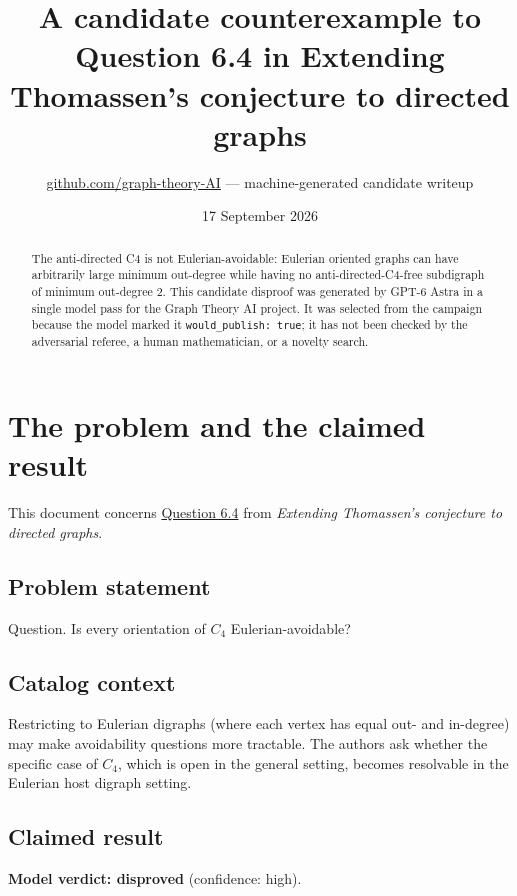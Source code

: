 \documentclass[
  11pt,
  a4paper,
]{article}
\title{A candidate counterexample to Question 6.4 in Extending
Thomassen's conjecture to directed graphs}
\author{\href{https://github.com/graph-theory-AI}{github.com/graph-theory-AI}
--- machine-generated candidate writeup}
\date{17 September 2026}
\begin{document}
\maketitle
\begin{abstract}
The anti-directed C4 is not Eulerian-avoidable: Eulerian oriented graphs
can have arbitrarily large minimum out-degree while having no
anti-directed-C4-free subdigraph of minimum out-degree 2. This candidate
disproof was generated by GPT-6 Astra in a single model pass for the
Graph Theory AI project. It was selected from the campaign because the
model marked it \texttt{would\_publish:\ true}; it has not been checked
by the adversarial referee, a human mathematician, or a novelty search.
\end{abstract}

\section{The problem and the claimed
result}\label{the-problem-and-the-claimed-result}

This document concerns
\href{https://graph-theory-ai.github.io/graph-conjectures/arxiv/2510.11311__04/}{Question
6.4} from \emph{Extending Thomassen's conjecture to directed graphs}.

\subsection{Problem statement}\label{problem-statement}

Question. Is every orientation of \(C_{4}\) Eulerian-avoidable?

\subsection{Catalog context}\label{catalog-context}

Restricting to Eulerian digraphs (where each vertex has equal out- and
in-degree) may make avoidability questions more tractable. The authors
ask whether the specific case of \(C_4\), which is open in the general
setting, becomes resolvable in the Eulerian host digraph setting.

\subsection{Claimed result}\label{claimed-result}

\textbf{Model verdict: disproved} (confidence: high).
\end{document}
